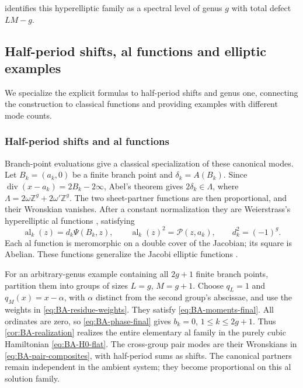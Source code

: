  identifies this hyperelliptic
family as a spectral level of genus $g$ with total defect $LM-g$.

\subsection{Half-period shifts, al functions and elliptic examples}
\label{sec:classical-BA-specializations}

We specialize the explicit formulas to half-period shifts and genus
one, connecting the construction to classical functions and providing
examples with different mode counts.

\subsubsection{Half-period shifts and al functions}
\label{sec:BA-al-functions}

Branch-point evaluations give a classical specialization of these
canonical modes. Let $B_k=(a_k,0)$ be a finite branch point and
$\delta_k=A(B_k)$. Since
$\operatorname{div}(x-a_k)=2B_k-2\infty$, Abel's theorem gives
$2\delta_k\in\Lambda$, where
$\Lambda=2\omega\mathbb Z^g+2\omega'\mathbb Z^g$.
The two sheet-partner functions are then proportional, and their
Wronskian vanishes. After a constant normalization they are
Weierstrass's hyperelliptic al functions
\cite{Weierstrass1856,MatsutaniPreviato2015}, satisfying
\begin{equation}\label{eq:BA-al-power}
 \operatorname{al}_k(z)=d_k\Psi(B_k,z),\qquad
 \operatorname{al}_k(z)^2=\mathcal P(z,a_k),\qquad d_k^2=(-1)^g.
\end{equation}
Each al function is meromorphic on a double cover of the Jacobian;
its square is Abelian. These functions generalize the Jacobi elliptic
functions \cite[Appendix]{MatsutaniPreviato2015}.

For an arbitrary-genus example containing all $2g+1$ finite branch
points, partition them into groups of sizes $L=g$, $M=g+1$.
Choose $q_L=1$ and $q_M(x)=x-\alpha$, with $\alpha$ distinct from
the second group's abscissae, and use the weights in
\cref{eq:BA-residue-weights}. They satisfy
\cref{eq:BA-moments-final}. All ordinates are zero, so
\cref{eq:BA-phase-final} gives $b_k=0$, $1\leq k\leq2g+1$.
Thus \cref{cor:BA-realization} realizes the entire elementary al
family in the purely cubic Hamiltonian \cref{eq:BA-H0-flat}.
The cross-group pair modes are their Wronskians in
\cref{eq:BA-pair-composites}, with half-period sums as shifts.
The canonical partners remain independent in the ambient system;
they become proportional on this al solution family.

